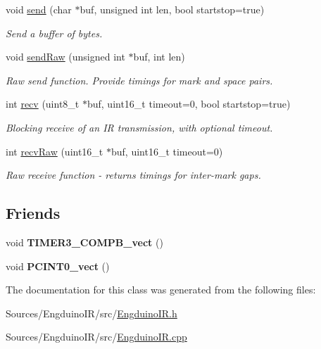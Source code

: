 \begin{DoxyCompactItemize}
void \hyperlink{group___engduino_i_r_ga2f933b89a87c5234454509bf6bc53ea5}{send} (char $\ast$buf, unsigned int len, bool startstop=true)
\begin{DoxyCompactList}\small\item\em Send a buffer of bytes. \end{DoxyCompactList}\item 
void \hyperlink{group___engduino_i_r_gadd747831975bc37388f0ad27f6085c60}{send\+Raw} (unsigned int $\ast$buf, int len)
\begin{DoxyCompactList}\small\item\em Raw send function. Provide timings for mark and space pairs. \end{DoxyCompactList}\item 
int \hyperlink{group___engduino_i_r_gaca86f6ca262e5a77553535000f0b24a9}{recv} (uint8\+\_\+t $\ast$buf, uint16\+\_\+t timeout=0, bool startstop=true)
\begin{DoxyCompactList}\small\item\em Blocking receive of an I\+R transmission, with optional timeout. \end{DoxyCompactList}\item 
int \hyperlink{group___engduino_i_r_ga62662ec690cb14fbd4b0bb511880cc77}{recv\+Raw} (uint16\+\_\+t $\ast$buf, uint16\+\_\+t timeout=0)
\begin{DoxyCompactList}\small\item\em Raw receive function -\/ returns timings for inter-\/mark gaps. \end{DoxyCompactList}\end{DoxyCompactItemize}
\subsection*{Friends}
\begin{DoxyCompactItemize}
\item 
\hypertarget{class_engduino_i_r_class_ac222d46ee6195df5e54711cc39202e78}{}void {\bfseries T\+I\+M\+E\+R3\+\_\+\+C\+O\+M\+P\+B\+\_\+vect} ()\label{class_engduino_i_r_class_ac222d46ee6195df5e54711cc39202e78}

\item 
\hypertarget{class_engduino_i_r_class_a7d11a7b3c8cae332581c5c8a077c8eaa}{}void {\bfseries P\+C\+I\+N\+T0\+\_\+vect} ()\label{class_engduino_i_r_class_a7d11a7b3c8cae332581c5c8a077c8eaa}

\end{DoxyCompactItemize}


The documentation for this class was generated from the following files\+:\begin{DoxyCompactItemize}
\item 
Sources/\+Engduino\+I\+R/src/\hyperlink{_engduino_i_r_8h}{Engduino\+I\+R.\+h}\item 
Sources/\+Engduino\+I\+R/src/\hyperlink{_engduino_i_r_8cpp}{Engduino\+I\+R.\+cpp}\end{DoxyCompactItemize}

